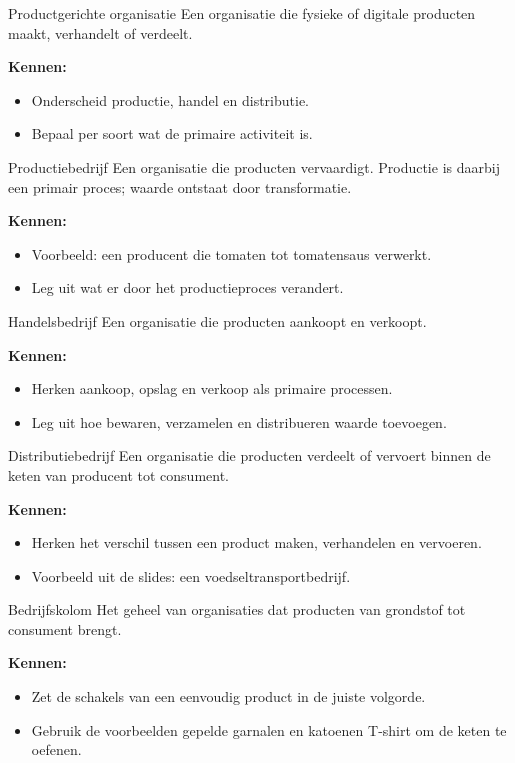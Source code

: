 \documentclass[11pt,a4paper]{article}
\newcommand{\kennen}{\par\smallskip\textbf{Kennen:}}
\begin{document}
\begin{definition}{Productgerichte organisatie}
Een organisatie die fysieke of digitale producten maakt, verhandelt of
verdeelt.
\kennen
\begin{itemize}
  \item Onderscheid productie, handel en distributie.
  \item Bepaal per soort wat de primaire activiteit is.
\end{itemize}
\end{definition}

\begin{definition}{Productiebedrijf}
Een organisatie die producten vervaardigt. Productie is daarbij een primair
proces; waarde ontstaat door transformatie.
\kennen
\begin{itemize}
  \item Voorbeeld: een producent die tomaten tot tomatensaus verwerkt.
  \item Leg uit wat er door het productieproces verandert.
\end{itemize}
\end{definition}

\begin{definition}{Handelsbedrijf}
Een organisatie die producten aankoopt en verkoopt.
\kennen
\begin{itemize}
  \item Herken aankoop, opslag en verkoop als primaire processen.
  \item Leg uit hoe bewaren, verzamelen en distribueren waarde toevoegen.
\end{itemize}
\end{definition}

\begin{definition}{Distributiebedrijf}
Een organisatie die producten verdeelt of vervoert binnen de keten van
producent tot consument.
\kennen
\begin{itemize}
  \item Herken het verschil tussen een product maken, verhandelen en vervoeren.
  \item Voorbeeld uit de slides: een voedseltransportbedrijf.
\end{itemize}
\end{definition}

\begin{definition}{Bedrijfskolom}
Het geheel van organisaties dat producten van grondstof tot consument brengt.
\kennen
\begin{itemize}
  \item Zet de schakels van een eenvoudig product in de juiste volgorde.
  \item Gebruik de voorbeelden gepelde garnalen en katoenen T-shirt om de keten te oefenen.
\end{itemize}
\end{definition}
\end{document}
